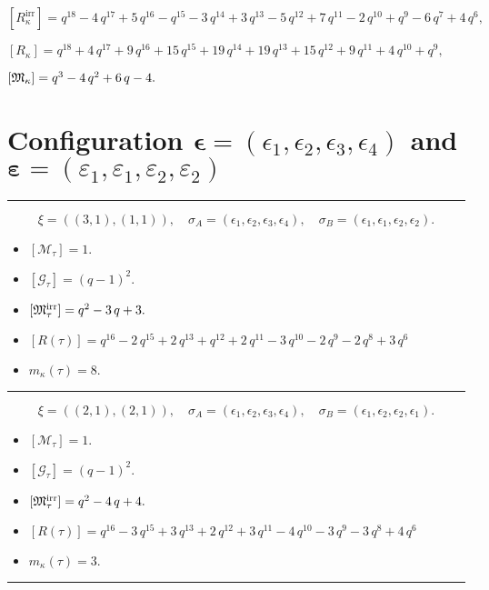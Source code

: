 \documentclass[10pt,a4paper]{amsart}
\begin{document}
${[R_{\kappa}^{\textrm{irr}}]} = q^{18} - 4 \, q^{17} + 5 \, q^{16} - q^{15} - 3 \, q^{14} + 3 \, q^{13} - 5 \, q^{12} + 7 \, q^{11} - 2 \, q^{10} + q^{9} - 6 \, q^{7} + 4 \, q^{6} ,$

${[R_{\kappa}]} = q^{18} + 4 \, q^{17} + 9 \, q^{16} + 15 \, q^{15} + 19 \, q^{14} + 19 \, q^{13} + 15 \, q^{12} + 9 \, q^{11} + 4 \, q^{10} + q^{9} ,$

${[{\frak M}_{\kappa}]} = q^{3} - 4 \, q^{2} + 6 \, q - 4 .$

\newpage{}

\section{Configuration $\bm{\epsilon} = (\epsilon_1,\epsilon_2,\epsilon_3,\epsilon_4)$ and $\bm{\varepsilon} =(\varepsilon_1,\varepsilon_1,\varepsilon_2,\varepsilon_2)$}
\noindent\rule{8cm}{0.4pt}

$$\xi = ({(3, 1), (1, 1)}),\quad \sigma_A = ({{\epsilon_1, \epsilon_2, \epsilon_3}, {\epsilon_4}}),\quad \sigma_B = ({{\epsilon_1, \epsilon_1, \epsilon_2}, {\epsilon_2}}).$$

\begin{itemize}
 \item $[\mathcal{M}_{\tau}] = 1 .$

 \item $[\mathcal{G}_{\tau}] = {\left(q - 1\right)}^{2} .$

 \item $[{\frak M}_{\tau}^{\textrm{irr}}] = q^{2} - 3 \, q + 3 .$

 \item $[R(\tau)] = q^{16} - 2 \, q^{15} + 2 \, q^{13} + q^{12} + 2 \, q^{11} - 3 \, q^{10} - 2 \, q^{9} - 2 \, q^{8} + 3 \, q^{6} $

 \item $m_{\kappa}(\tau) = 8 .$

 \end{itemize}
\noindent\rule{8cm}{0.4pt}

$$\xi = ({(2, 1), (2, 1)}),\quad \sigma_A = ({{\epsilon_1, \epsilon_2}, {\epsilon_3, \epsilon_4}}),\quad \sigma_B = ({{\epsilon_1, \epsilon_2}, {\epsilon_2, \epsilon_1}}).$$

\begin{itemize}
 \item $[\mathcal{M}_{\tau}] = 1 .$

 \item $[\mathcal{G}_{\tau}] = {\left(q - 1\right)}^{2} .$

 \item $[{\frak M}_{\tau}^{\textrm{irr}}] = q^{2} - 4 \, q + 4 .$

 \item $[R(\tau)] = q^{16} - 3 \, q^{15} + 3 \, q^{13} + 2 \, q^{12} + 3 \, q^{11} - 4 \, q^{10} - 3 \, q^{9} - 3 \, q^{8} + 4 \, q^{6} $

 \item $m_{\kappa}(\tau) = 3 .$

 \end{itemize}
\noindent\rule{8cm}{0.4pt}
\end{document}

